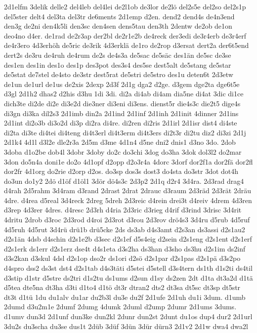 {2d1elfm
3delik
delle2
del4leb
del4lei
de2l1ob
de3lor
de2lö
del2s5e
del2so
del2s1p
del5ster
delt4
del3ta
del3tr
de6ments
2d1emp
d2en.
dend2
dend4s
de4n3end
den3g
de2ni
den4k5li
den3sc
den4sen
dens5tau
den3th
2dentw
de2ob
de1on
deo4no
d4er.
de1rad
de2r3ap
der2bl
de2r1e2b
de4reck
der3edi
de3r4erb
de3r4erf
de4r3ero
4d3erhöh
de5ric
de3rik
4d3erklä
de1ro
de2rop
d3ersat
dert2a
der6t5end
dert2s
de3ru
de4ruh
de4rum
de2s
de4s3a
de5sac
de5säc
des1än
de5sc
de3se
des1en
des1in
des1o
des1p
des3pot
des3s4
des5se
dest5alt
de5stang
de5star
de5stat
de7stel
de4sto
de3str
dest5rat
de5stri
de5stro
des1u
deten6t
2d3etw
de1un
de1url
de1us
de2xis
2dexp
2d3f
2d1g
dga2
d2ge.
d3gem
dge2ta
dge6t5e
d3gl
2d1h2
dhas2
d2his
d3hu
1di
3di.
di2a
di4ab
di4am
dia5ne
di4at
3dic
di1ce
dich3te
di2de
di2e
di3e2d
die3ner
di3eni
di3ens.
dienst5r
die4s3c
die2t5
dige4s
di3gn
di3ka
dil2s3
2d1imb
din2a
2d1ind
2d1inf
2d1inh
2d1init
4dinner
2d1ins
2d1int
di2o3b
di3o2d
di3p
di2ra
di4re.
di2ren
di2ris
2d1irl
2d1isr
dist4
di4ste
di2ta
di3te
di4tei
di4teng
di4t3erl
di4t3erm
di4t3ers
di2t3r
di2tu
diz2
di3zi
2d1j
2d1k4
4d1l
d3l2e
dle2r3a
2d5m
d3me
4d1n4
d5ne
dni2
dnis1
d3no
3do.
2dob
3doba
d1o2be
dob4l
3dobr
3doby
do2c
do3chi
3dog
do3ha
3dok
dol3l2
do2mar
3don
do5n4a
doni1e
do2o
4d1opf
d2opp
d2o3r4a
4dorc
3dorf
dor2f1a
dor2fä
dor2fl
dor2fr
4d1org
do2rie
d2orp
d2os.
do3sp
dos3s
dost3
do4sta
do3str
3dot
dot4h
do3un
do1y2
2dö
d1öf
d1öl1
3dör
dö4s3c
2d3p2
2d1q
d2r4
3d4ra.
2d3rad
drag4
d4rah
2d5rahm
3d4ram
d3rand
2drast
2drat
2drauc
d3raum
2d3räd
2d3rät
2dräu
4dre.
d4rea
d5real
3d4reck
2dreg
5dreh
2d3reic
d4rein
drei3t
d4reiv
4drem
4d3ren
d3rep
4d3rer
4dres.
d4resc
2d3rh
d4ria
2d3ric
d3rieg
d4rif
d3rind
3drisc
3d4rit
4dritu
2drob
d3roc
2d3rod
d4roi
2d3rot
d3rou
2d3rov
drö4s3
3d4ru
d5rub
4d5ruf
4d5ruh
4d5rut
3d4rü
drü1b
drü5cke
2ds
ds3ab
d4s3amt
d2s3an
ds3assi
d2s1au2
d2s1än
4dsb
d4schin
d2s1e2b
d3sec
d2s1ef
d5s4eig
d2sein
d2s1eng
d2s1ent
d2s1erf
d2s1erk
ds1err
d2s1erz
dse4t
d4s1eta
d3s2ha
ds3han
d3sho
ds3hu
d2s1im
ds2inf
d3s2kan
d3skul
4dsl
d2s1op
dso2r
ds1ori
d2sö
d2s1par
d2s1pas
d2s1pä
d3s2po
d4spro
dss2
ds3st
dst4
d2s1tab
d4s3täti
d5stei
d5stell
d3s4tern
ds1th
d1s2ti
ds4til
d3stip
d1str
d5stre
ds2tri
d1s2tu
ds1ums
d2sun
d1sy
ds2zen
2dt
d1ta
dt3a2d
d1tä
d5tea
dte5na
dt3ha
d3ti
d1to4
d1tö
dt3r
dtran2
dts2
dt3sa
dt5sc
dt3sp
dt5str
dt3t
d1tü
1du
du1alv
du1ar
du2b3l
du3e
du2f
2d1ufe
2d1uh
du1i
3dum.
d1umb
2dumd
d3u2m1e
2dumf
2dumg
4dumk
2duml
d2ump
2dumr
2d1ums
3dums.
d1umv
dun3d
2d1unf
dun3ke
dun2kl
2dunr
dun2st
2dunt
du1os
dup4
dur2
2d1url
3du2s
du3scha
du3se
dus1t
2düb
3düf
3dün
3dür
dürn3
2d1v2
2d1w
dwa4
dwa2l
}
